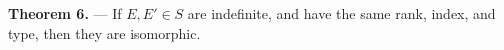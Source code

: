 \textbf{Theorem 6.} — If $E, E' \in S$ are indefinite, and have the same rank, index, and type, then they are isomorphic.
